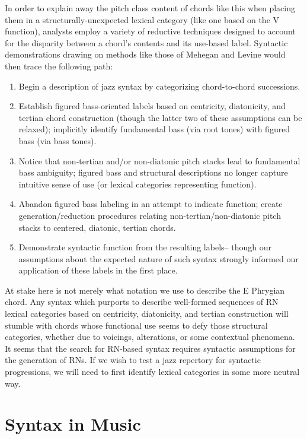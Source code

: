 In order to explain away the pitch class content of chords like this when placing them in a structurally-unexpected lexical category (like one based on the V function), analysts employ a variety of reductive techniques designed to account for the disparity between a chord's contents and its use-based label.  Syntactic demonstrations drawing on methods like those of Mehegan and Levine would then trace the following path:
\begin{enumerate}
	\item Begin a description of jazz syntax by categorizing chord-to-chord successions.
	\item Establish figured bass-oriented labels based on centricity, diatonicity, and tertian chord construction (though the latter two of these assumptions can be relaxed); implicitly identify fundamental bass (via root tones) with figured bass (via bass tones).
	\item Notice that non-tertian and/or non-diatonic pitch stacks lead to fundamental bass ambiguity; figured bass and structural descriptions no longer capture intuitive sense of use (or lexical categories representing function).
	\item Abandon figured bass labeling in an attempt to indicate function; create generation/reduction procedures relating non-tertian/non-diatonic pitch stacks to centered, diatonic, tertian chords.
	\item Demonstrate syntactic function from the resulting labels-- though our assumptions about the expected nature of such syntax strongly informed our application of these labels in the first place.
\end{enumerate}

At stake here is not merely what notation we use to describe the E Phrygian chord.  Any syntax which purports to describe well-formed sequences of RN lexical categories based on centricity, diatonicity, and tertian construction will stumble with chords whose functional use seems to defy those structural categories, whether due to voicings, alterations, or some contextual phenomena.  It seems that the search for RN-based syntax requires syntactic assumptions for the generation of RNs.  If we wish to test a jazz repertory for syntactic progressions, we will need to first identify lexical categories in some more neutral way.

\section{Syntax in Music}%


